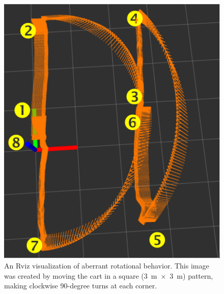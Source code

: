 \begin{figure}
  \centering
    \includegraphics[height=0.8\textwidth]{rot_bug_rviz}
  \caption[Rviz Visualization of Rotational Distortion]{An Rviz visualization of aberrant rotational behavior. This image was created by moving the cart in a square (3~m~$\times$~3~m) pattern, making clockwise 90-degree turns at each corner.}
  \label{fig:rot_bug_rviz}
\end{figure}
